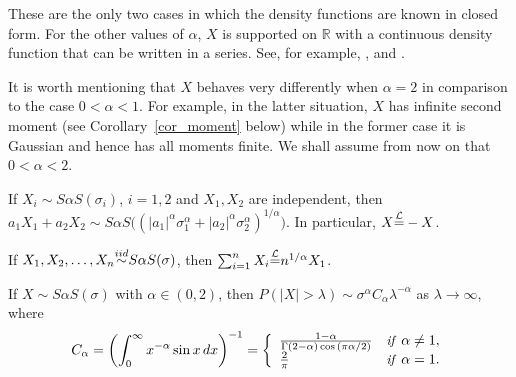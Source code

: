 \documentclass[12pt]{amsart}
\begin{document}
These are the only two cases in which the density functions are known in closed form. For the other values of $\alpha$, $X$ is supported on $\mathbb{R}$ with a continuous density function that can be written in a series. See, for example, \cite{ibragimov:linnik:1971}, \cite{feller:1971} and \cite{zolotarev:1986}. 

It is worth mentioning that $X$ behaves very differently when $\alpha =2$ in comparison to the case $0 < \alpha < 1$. For example, in the latter situation, $X$ has infinite second moment (see Corollary~\ref{cor_moment} below) while in the former case it is Gaussian and hence has all moments finite. We shall assume from now on that $0 <\alpha < 2$.

\begin{prop} If $X_i \sim S\alpha S(\sigma_i)$, $i=1,2$ and $X_1 , X_2$ are independent, then $a_1 X_1+a_2 X_2\sim S\alpha S \big((|a_1|^\alpha \sigma_1^\alpha+|a_2|^\alpha \sigma_2^\alpha)^{1/\alpha}\big)$. In particular, $X {\stackrel{\footnotesize{\mathcal{L}}}{=}} -X$.
\end{prop}

\begin{prop} If $X_1, X_2, \ldots, X_n {\stackrel{\footnotesize{iid}}{\sim}} S\alpha S(\sigma)$, then $\sum_{i=1}^n X_i {\stackrel{\footnotesize{\mathcal{L}}}{=}} n^{1/\alpha} X_1$.
\end{prop}

\begin{prop} \label{prop_tail_behaviour} If $X \sim S\alpha S(\sigma)$ with $\alpha \in (0,2)$, then $P(|X|>\lambda) \sim \sigma^\alpha C_\alpha \lambda^{-\alpha}$ as $\lambda \to \infty$, where \begin{equation}
C_\alpha = {\left(\int_0^\infty x^{-\alpha} \sin{x}\,dx
\right)}^{-1}
 =\left\{
  \begin{array}{ll}
  \frac{1-\alpha}{\Gamma(2-\alpha) \cos{(\pi
\alpha/2)}}&\mbox{\textit{\small{if }}}\alpha \neq 1,\\
  \frac{2}{\pi}
&\mbox{\textit{\small{if }}}\alpha = 1.
  \end{array}
 \right. \label{defn_C_alpha}
\end{equation}
\end{prop}
\end{document}
